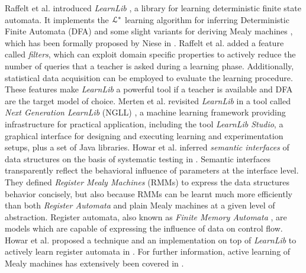 Raffelt et al. introduced \textit{LearnLib}
\cite{Raffelt:2005:LLA:1081180.1081189}, a library for learning
deterministic finite state automata. It implements the
$\EuScript{L}^*$ \cite{Angluin198787} learning algorithm for
inferring Deterministic Finite Automata (DFA) and some slight
variants for deriving Mealy machines \cite{6771467}, which has
been formally proposed by Niese in \cite{DBLP:phd/de/Niese2003}.
Raffelt et al. added a feature called \textit{filters}, which can
exploit domain specific properties to actively reduce the number
of queries that a teacher is asked during a learning phase.
Additionally, statistical data acquisition can be employed to
evaluate the learning procedure. These features make
\textit{LearnLib} a powerful tool if a teacher is available and
DFA are the target model of choice.  Merten et al. revisited
\textit{LearnLib} in a tool called \textit{Next Generation
LearnLib} (NGLL) \cite{ngll11}, a machine learning framework
providing infrastructure for practical application, including the
tool \textit{LearnLib Studio}, a graphical interface for
designing and executing learning and experimentation setups, plus
a set of Java libraries. Howar et al. inferred \textit{semantic
interfaces} of data structures on the basis of systematic testing
in \cite{howar2012}. Semantic interfaces transparently reflect
the behavioral influence of parameters at the interface level.
They defined \textit{Register Mealy Machines} (RMMs) to express
the data structures behavior concisely, but also because RMMs can
be learnt much more efficiently than both \textit{Register
Automata} and plain Mealy machines at a given level of
abstraction. Register automata, also known as \textit{Finite
Memory Automata} \cite{Kaminski1994329}, are models which are
capable of expressing the influence of data on control flow.
Howar et al. proposed a technique and an implementation on top of
\textit{LearnLib} to actively learn register automata in
\cite{howarRA2012}. For further information, active learning of
Mealy machines has extensively been covered in \cite{steffen11}.

